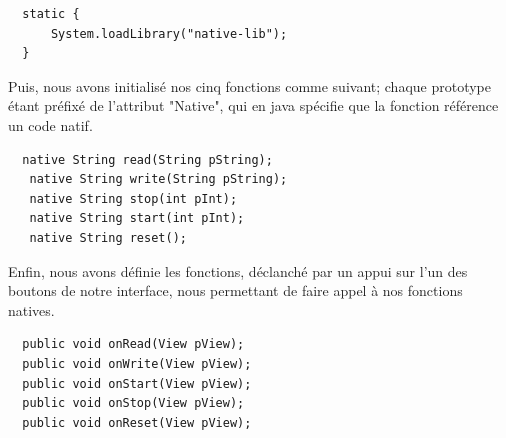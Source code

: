 \documentclass[french,a4paper,12pt]{report}
\begin{document}
\begin{lstlisting}
  static {
      System.loadLibrary("native-lib");
  }
\end{lstlisting}

Puis, nous avons initialisé nos cinq fonctions comme suivant; chaque prototype
étant préfixé de l'attribut "Native", qui en java spécifie que la fonction
référence un code natif.

\begin{lstlisting}
  native String read(String pString);
   native String write(String pString);
   native String stop(int pInt);
   native String start(int pInt);
   native String reset();
\end{lstlisting}

Enfin, nous avons définie les fonctions, déclanché par un appui sur l'un des
boutons de notre interface, nous permettant de faire appel à nos fonctions natives.

\begin{lstlisting}
  public void onRead(View pView);
  public void onWrite(View pView);
  public void onStart(View pView);
  public void onStop(View pView);
  public void onReset(View pView);
\end{lstlisting}
\end{document}
